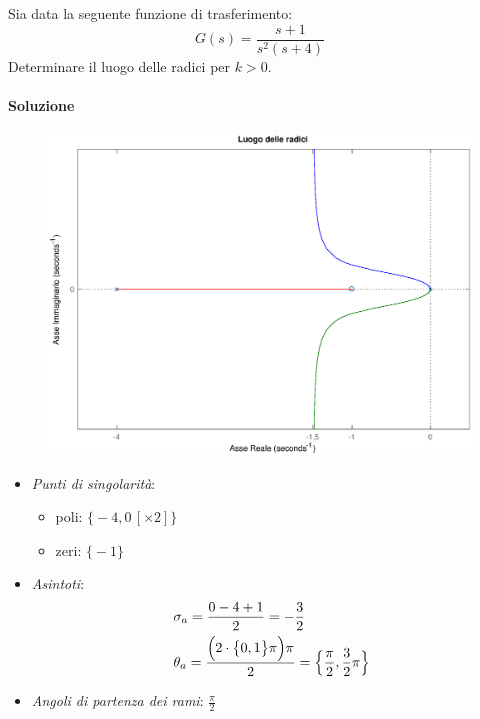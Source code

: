 \begin{esercizio}
Sia data la seguente funzione di trasferimento:
\[
	G(s) = \frac{s+1}{s^2 (s+4)}
\]
Determinare il luogo delle radici per \(k>0\).

\paragraph{Soluzione}

\begin{figure}[ht]
	\centering
	\includegraphics[scale=.6]{mod1/assets/rl_ex35}
\end{figure}

\begin{itemize}
	\item \emph{Punti di singolarità}:
		\begin{itemize}
			\item poli: \(\bigl\{ -4, 0\,[\times 2] \bigr\}\)
			\item zeri: \(\bigl\{ -1 \bigr\}\)
		\end{itemize}
	\item \emph{Asintoti}:
		\begin{align*}
			& \sigma_a = \frac{0-4+1}{2} = -\frac{3}{2} \\
			& \theta_a = \frac{\Bigl( 2 \cdot \bigl\{ 0,1 \bigr\} \pi \Bigr) \pi}{2} = \Bigl\{ \frac{\pi}{2}, \frac{3}{2}\pi \Bigr\}
		\end{align*}
	\item \emph{Angoli di partenza dei rami}: \(\frac{\pi}{2}\)
\end{itemize}
\end{esercizio}

